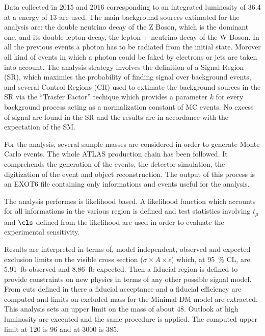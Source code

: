 Data collected in 2015 and 2016 corresponding to an integrated luminosity of \SI{36.4}{\ifb} at a \cm energy of \SI{13}{\tev} are used. The main background sources extimated for the \mph analysis are: the double neutrino decay of the Z Boson, which is the dominant one, and its double lepton decay, the lepton + neutrino decay of the W Boson. In all the previous events a photon has to be radiated from the initial state. Morover all kind of events in which a photon could be faked by electrons or jets are taken into account. The analysis strategy involves the definition of a Signal Region (SR), which maximies the probability of finding signal over background events, and several Control Regions (CR) used to extimate the background sources in the SR via the ``Trasfer Factor'' techique which provides a parameter $k$ for every background process  acting as a normalization constant of MC events. No excess of signal are found in the SR and the results are in accordance with the expectation of the SM.
  
For the analysis, several sample masses are considered in order to generate Monte Carlo events.  The whole ATLAS production chain has been followed. It comprehends the generation of the events, the detector simulation, the digitization of the event and object reconstruction. The output of this process is an EXOT6 file containing only informations  and events useful for the \mph analysis. 

The analysis performes is likelihood based. A likelihood function which accounts for all informations in the various region is defined and test statistics involving $t_\mu$ and $\cls$ defined from the likelihood are used in order to evaluate the experimental sensitivity.

Results are interpreted in terms of, model independent, observed and expected exclusion limits on the visible cross section ($\sigma\times A\times\epsilon$) which, at \SI{95}{\percent} CL, are \SI{5.91}{fb} observed and \SI{8.86}{fb} expected. Then a fiducial region is defined to provide constraints on new physics in terms of any other possible signal model. From cuts defined in there a fiducial acceptance and a fiducial efficiency are computed and limits on excluded mass for the Minimal DM model are extracted. This analysis sets an upper limit on the \chizero mass of about \SI{48}{\gev}. Outlook at high luminosity are executed and the same procedure is applied. The computed upper limit at \SI{120}{\ifb} is \SI{96}{\gev} and at \SI{3000}{\ifb} is \SI{385}{\gev}.

